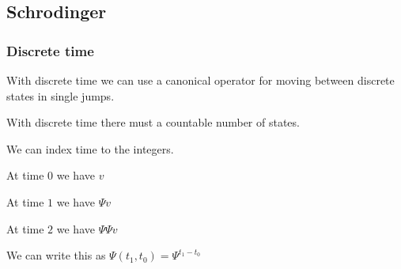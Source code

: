 
\subsection{Schrodinger}

\subsubsection{Discrete time}

With discrete time we can use a canonical operator for moving between discrete states in single jumps.

With discrete time there must a countable number of states.

We can index time to the integers.

At time \(0\) we have \(v\)

At time \(1\) we have \(\Psi v\)

At time \(2\) we have \(\Psi \Psi v\)

We can write this as \(\Psi (t_1,t_0)=\Psi ^{t_1-t_0}\)

